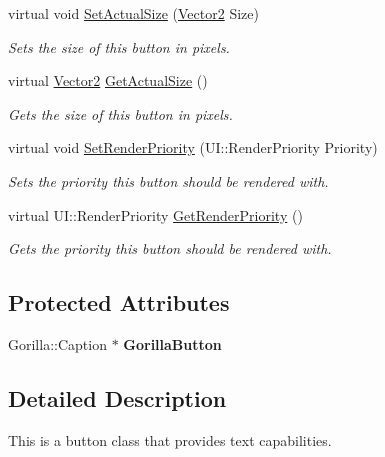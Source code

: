 \begin{DoxyCompactItemize}
virtual void \hyperlink{classphys_1_1UI_1_1TextButton_ad83c81eda54a861b9e34b565027b8254}{SetActualSize} (\hyperlink{classphys_1_1Vector2}{Vector2} Size)
\begin{DoxyCompactList}\small\item\em Sets the size of this button in pixels. \item\end{DoxyCompactList}\item 
virtual \hyperlink{classphys_1_1Vector2}{Vector2} \hyperlink{classphys_1_1UI_1_1TextButton_a062b31c199f875d4f825f6be1d11fb55}{GetActualSize} ()
\begin{DoxyCompactList}\small\item\em Gets the size of this button in pixels. \item\end{DoxyCompactList}\item 
virtual void \hyperlink{classphys_1_1UI_1_1TextButton_a7d4e22acd792b10f2f7986d8f449ec16}{SetRenderPriority} (UI::RenderPriority Priority)
\begin{DoxyCompactList}\small\item\em Sets the priority this button should be rendered with. \item\end{DoxyCompactList}\item 
virtual UI::RenderPriority \hyperlink{classphys_1_1UI_1_1TextButton_ad339621af6e73ff9702c0dd4cdadbb73}{GetRenderPriority} ()
\begin{DoxyCompactList}\small\item\em Gets the priority this button should be rendered with. \item\end{DoxyCompactList}\end{DoxyCompactItemize}
\subsection*{Protected Attributes}
\begin{DoxyCompactItemize}
\item 
\hypertarget{classphys_1_1UI_1_1TextButton_a33fe39747602f948b462e008cb75bb5e}{
Gorilla::Caption $\ast$ {\bfseries GorillaButton}}
\label{df/d03/classphys_1_1UI_1_1TextButton_a33fe39747602f948b462e008cb75bb5e}

\end{DoxyCompactItemize}


\subsection{Detailed Description}
This is a button class that provides text capabilities. 

